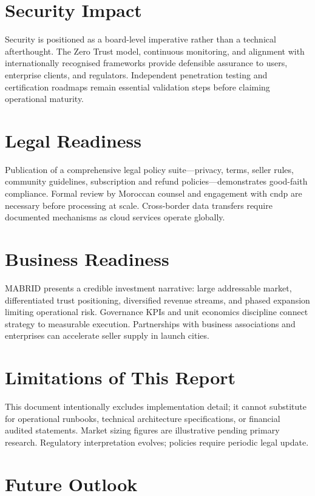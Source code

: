 \section{Security Impact}

Security is positioned as a board-level imperative rather than a technical afterthought. The Zero Trust model, continuous monitoring, and alignment with internationally recognised frameworks provide defensible assurance to users, enterprise clients, and regulators. Independent penetration testing and certification roadmaps remain essential validation steps before claiming operational maturity.

\section{Legal Readiness}

Publication of a comprehensive legal policy suite---privacy, terms, seller rules, community guidelines, subscription and refund policies---demonstrates good-faith compliance. Formal review by Moroccan counsel and engagement with \gls{cndp} are necessary before processing at scale. Cross-border data transfers require documented mechanisms as cloud services operate globally.

\section{Business Readiness}

MABRID presents a credible investment narrative: large addressable market, differentiated trust positioning, diversified revenue streams, and phased expansion limiting operational risk. Governance KPIs and unit economics discipline connect strategy to measurable execution. Partnerships with business associations and enterprises can accelerate seller supply in launch cities.

\section{Limitations of This Report}

This document intentionally excludes implementation detail; it cannot substitute for operational runbooks, technical architecture specifications, or financial audited statements. Market sizing figures are illustrative pending primary research. Regulatory interpretation evolves; policies require periodic legal update.

\section{Future Outlook}

